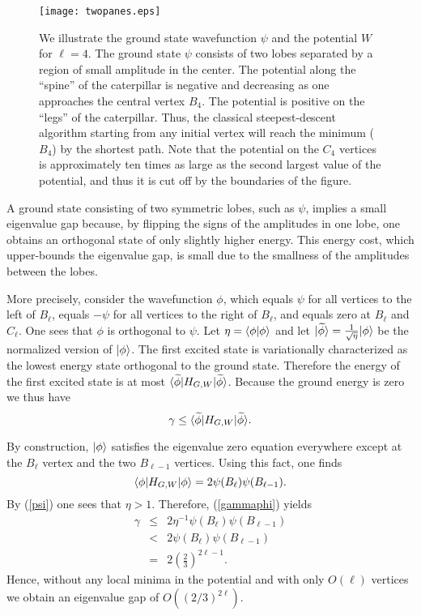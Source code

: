 \begin{figure}
\begin{center}
\texttt{[image: twopanes.eps]}
\caption{\label{twopanes} We illustrate the ground state wavefunction
  $\psi$ and the 
  potential $W$ for $\ell = 4$. The ground state $\psi$ consists
  of two lobes separated by a region of small amplitude in the
  center. The potential along the ``spine'' of the caterpillar is
  negative and decreasing as one approaches the central vertex
  $B_4$. The  potential is positive on the ``legs'' of the
  caterpillar. Thus, the classical steepest-descent algorithm starting
  from any initial vertex will reach the minimum ($B_4$) by the
  shortest path. Note that the potential on the $C_4$ vertices is
  approximately ten times as large as the second largest value of the
  potential, and thus it is cut off by the boundaries of the figure.}
\end{center}
\end{figure}

A ground state consisting of two symmetric lobes, such as $\psi$,
implies a small eigenvalue gap because, by flipping the signs of the
amplitudes in one lobe, one obtains an orthogonal state of only
slightly higher energy. This energy cost, which upper-bounds the
eigenvalue gap, is small due to the smallness of the amplitudes
between the lobes.

More precisely, consider the wavefunction $\phi$, which equals $\psi$ for all
vertices to the left of $B_{\ell}$, equals $-\psi$ for all vertices
to the right of $B_{\ell}$, and equals zero at $B_{\ell}$ and
$C_\ell$. One sees that $\phi$ is orthogonal to $\psi$. Let $\eta =
\langle \phi|\phi\rangle$ and let $|\widetilde{\phi}\rangle =
\frac{1}{\sqrt{\eta}} |\phi\rangle$ be the normalized version of
$|\phi\rangle$. The first excited state is variationally characterized
as the lowest energy state orthogonal to the ground state. Therefore
the energy of the first excited state is at most
$\langle \widetilde{\phi}| H_{G,W} |\widetilde{\phi}\rangle$. Because the
ground energy is zero we thus have
\begin{equation}
\label{gammaphi}
\gamma \leq \langle \widetilde{\phi}| H_{G,W} |\widetilde{\phi}\rangle.
\end{equation}

By construction, $|\phi\rangle$ satisfies the 
eigenvalue zero equation everywhere except at the $B_{\ell}$ vertex
and the two $B_{\ell-1}$ vertices. Using this fact, one finds
\begin{equation}
\langle \phi| H_{G,W} |\phi\rangle = 2 \psi(B_{\ell}) \psi(B_{\ell-1}).
\end{equation}
By (\ref{psi}) one sees that $\eta > 1$. Therefore,
(\ref{gammaphi}) yields 
\begin{eqnarray}
\gamma & \leq & 2 \eta^{-1} \psi(B_{\ell})\psi(B_{\ell-1}) \\
       & < & 2 \psi(B_{\ell}) \psi(B_{\ell-1}) \\
       & = & 2 \left( \frac{2}{3} \right)^{2\ell-1}.
\end{eqnarray}
Hence, without any local minima in the potential and with only
$O(\ell)$ vertices we obtain an eigenvalue gap of $O((2/3)^{2\ell})$. 

